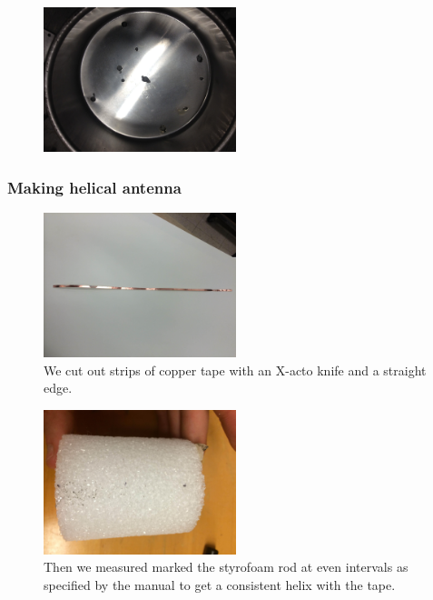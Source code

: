 \documentclass[11pt]{article} %
\begin{document}
\begin{figure}
  \centering
  \caption{  }
  \includegraphics[width=0.50\textwidth]{feed/08.jpeg}
\end{figure}


\subsubsection{Making helical antenna}



\begin{figure}
  \centering
  \caption{ We cut out strips of copper tape with an X-acto knife and a straight edge.  }
  \includegraphics[width=0.50\textwidth]{feed/09.jpeg}
\end{figure}



\begin{figure}
  \centering
  \caption{ Then we measured marked the styrofoam rod at even intervals as specified by the manual to get a consistent helix with the tape.  }
  \includegraphics[width=0.50\textwidth]{feed/10.jpeg}
\end{figure}
\end{document}
